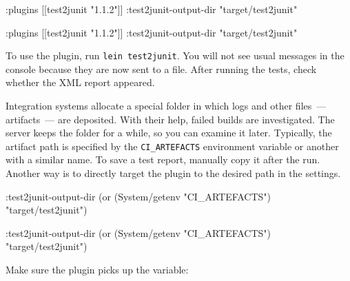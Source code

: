 \ifnarrow

\begin{english}
  \begin{clojure}
:plugins [[test2junit "1.1.2"]]
:test2junit-output-dir
  "target/test2junit"
  \end{clojure}
\end{english}

\else

\begin{english}
  \begin{clojure}
:plugins [[test2junit "1.1.2"]]
:test2junit-output-dir "target/test2junit"
  \end{clojure}
\end{english}

\fi

To use the plugin, run \verb|lein test2junit|. You will not see usual messages in the console because they are now sent to a file. After running the tests, check whether the XML report appeared.

Integration systems allocate a special folder in which logs and other files~--- artifacts~--- are deposited. With their help, failed builds are investigated. The server keeps the folder for a while, so you can examine it later. Typically, the artifact path is specified by the \verb|CI_ARTEFACTS| environment variable or another with a similar name. To save a test report, manually copy it after the run. Another way is to directly target the plugin to the desired path in the settings.

\ifnarrow

\begin{english}
  \begin{clojure}
:test2junit-output-dir
  (or (System/getenv "CI_ARTEFACTS")
      "target/test2junit")
  \end{clojure}
\end{english}

\else

\begin{english}
  \begin{clojure}
:test2junit-output-dir (or (System/getenv "CI_ARTEFACTS")
                           "target/test2junit")
  \end{clojure}
\end{english}

\fi

\noindent
Make sure the plugin picks up the variable:

\ifnarrow

